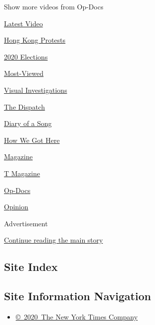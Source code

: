 Show more videos from Op-Docs

\href{/video}{}

\href{/video/latest-video}{Latest Video}

\href{/video/hk-protest}{Hong Kong Protests}

\href{/video/2020-Elections}{2020 Elections}

\href{/video/Most-Viewed}{Most-Viewed}

\href{/video/investigations}{Visual Investigations}

\href{/video/on-the-ground}{The Dispatch}

\href{/video/diaryofasong}{Diary of a Song}

\href{/video/how-we-got-here}{How We Got Here}

\href{/video/magazine}{Magazine}

\href{/video/t-magazine}{T Magazine}

\href{/video/op-docs}{Op-Docs}

\href{/video/opinion}{Opinion}

Advertisement

\protect\hyperlink{after-bottom}{Continue reading the main story}

\hypertarget{site-index}{%
\subsection{Site Index}\label{site-index}}

\hypertarget{site-information-navigation}{%
\subsection{Site Information
Navigation}\label{site-information-navigation}}

\begin{itemize}
\tightlist
\item
  \href{https://help.nytimes3xbfgragh.onion/hc/en-us/articles/115014792127-Copyright-notice}{©~2020~The
  New York Times Company}
\end{itemize}


